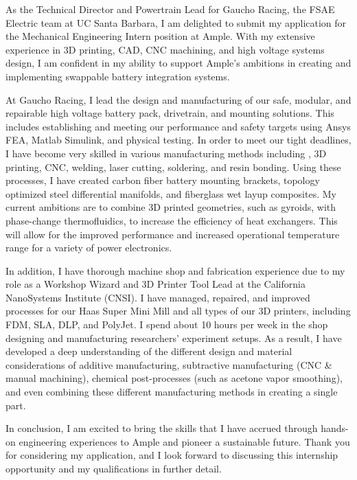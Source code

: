 \documentclass[11pt, letterpaper]{awesome-cv} %
\begin{document}
\makecvheader %

\makelettertitle %


\begin{cvletter}


As the Technical Director and Powertrain Lead for Gaucho Racing, the FSAE Electric team at UC Santa Barbara, I am delighted to submit my application for the Mechanical Engineering Intern position at Ample. With my extensive experience in 3D printing, CAD, CNC machining, and high voltage systems design, I am confident in my ability to support Ample's ambitions in creating and implementing swappable battery integration systems.

At Gaucho Racing, I lead the design and manufacturing of our safe, modular, and repairable high voltage battery pack, drivetrain, and mounting solutions. This includes establishing and meeting our performance and safety targets using Ansys FEA, Matlab Simulink, and physical testing. In order to meet our tight deadlines, I have become very skilled in various manufacturing methods including , 3D printing, CNC, welding, laser cutting, soldering, and resin bonding. Using these processes, I have created carbon fiber battery mounting brackets, topology optimized steel differential manifolds, and fiberglass wet layup composites. My current ambitions are to combine 3D printed geometries, such as gyroids, with phase-change thermofluidics, to increase the efficiency of heat exchangers. This will allow for the improved performance and increased operational temperature range for a variety of power electronics.

In addition, I have thorough machine shop and fabrication experience due to my role as a Workshop Wizard and 3D Printer Tool Lead at the California NanoSystems Institute (CNSI). I have managed, repaired, and improved processes for our Haas Super Mini Mill and all types of our 3D printers, including FDM, SLA, DLP, and PolyJet. I spend about 10 hours per week in the shop designing and manufacturing researchers' experiment setups. As a result, I have developed a deep understanding of the different design and material considerations of additive manufacturing, subtractive manufacturing (CNC \& manual machining), chemical post-processes (such as acetone vapor smoothing), and even combining these different manufacturing methods in creating a single part.

In conclusion, I am excited to bring the skills that I have accrued through hands-on engineering experiences to Ample and pioneer a sustainable future. Thank you for considering my application, and I look forward to discussing this internship opportunity and my qualifications in further detail.


\end{cvletter}


\makeletterclosing %
\end{document}
